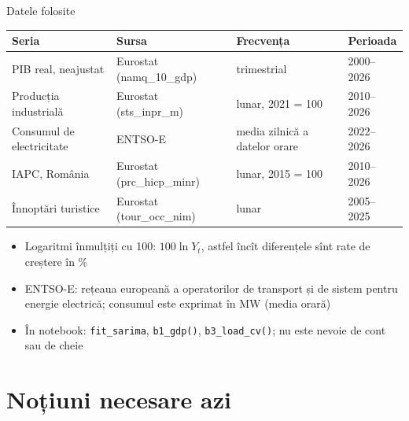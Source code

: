 \begin{frame}{Datele folosite}
\itemsize{\small}
\begin{center}
\footnotesize
\begin{tabular}{llll}
\toprule
\textbf{Seria} & \textbf{Sursa} & \textbf{Frecvența} & \textbf{Perioada} \\
\midrule
PIB real, neajustat & Eurostat (namq\_10\_gdp) & trimestrial & 2000--2026 \\
Producția industrială & Eurostat (sts\_inpr\_m) & lunar, 2021 = 100 & 2010--2026 \\
Consumul de electricitate & ENTSO-E & media zilnică a datelor orare & 2022--2026 \\
IAPC, România & Eurostat (prc\_hicp\_minr) & lunar, 2015 = 100 & 2010--2026 \\
Înnoptări turistice & Eurostat (tour\_occ\_nim) & lunar & 2005--2025 \\
\bottomrule
\end{tabular}
\end{center}
\begin{itemize}
    \item Logaritmi înmulțiți cu 100: $100\ln Y_t$, astfel încît diferențele sînt rate de creștere în \%
    \item ENTSO-E: rețeaua europeană a operatorilor de transport și de sistem pentru energie electrică; consumul este exprimat în MW (media orară)
    \item În notebook: \texttt{fit\_sarima}, \texttt{b1\_gdp()}, \texttt{b3\_load\_cv()}; nu este nevoie de cont sau de cheie
\end{itemize}
\end{frame}


\section{Noțiuni necesare azi}

